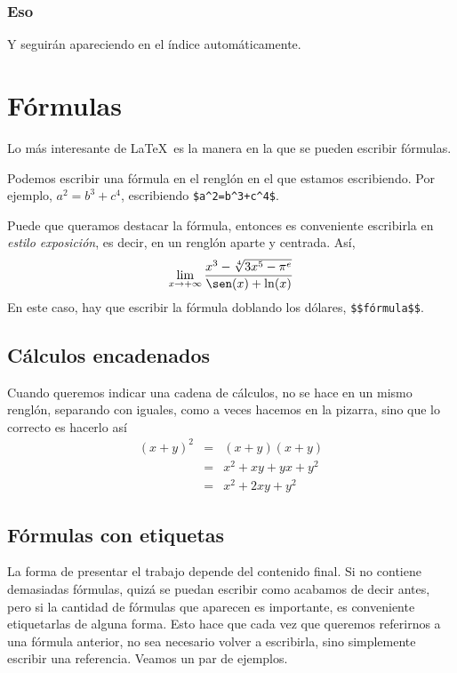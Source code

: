 \documentclass[a4paper,12pt]{article}
\begin{document}
{\subsubsection{Eso}

Y seguirán apareciendo en el índice automáticamente.


\section{Fórmulas}

Lo más interesante de \LaTeX \ es la manera en la que se pueden escribir fórmulas.


Podemos escribir una fórmula en el renglón en el que estamos escribiendo. Por ejemplo, $a^2=b^3+c^4$, escribiendo \verb|$a^2=b^3+c^4$|.

Puede que queramos destacar la fórmula, entonces es conveniente escribirla en \textsl{estilo exposición}, es decir, en un renglón aparte y centrada. Así,
$$\lim_{x\to +\infty}\dfrac{x^3-\sqrt[4]{3x^5-\pi^e}}{\sen(x)+\ln(x)}$$
En este caso, hay que escribir la fórmula doblando los dólares, \verb|$$fórmula$$|.


\subsection{Cálculos encadenados}

Cuando queremos indicar una cadena de cálculos, no se hace en un mismo renglón, separando con iguales, como a veces hacemos en la pizarra, sino que lo correcto es hacerlo así
$$\begin{array}{lll}
(x+y)^2&=&(x+y)(x+y)\\
&=&x^2+xy+yx+y^2\\
&=&x^2+2xy+y^2
\end{array}
$$

\subsection{Fórmulas con etiquetas}
La forma de presentar el trabajo depende del contenido final. Si no contiene demasiadas fórmulas, quizá se puedan escribir como acabamos de decir antes, pero si la cantidad de fórmulas que aparecen es importante, es conveniente etiquetarlas de alguna forma. Esto hace que cada vez que queremos referirnos a una fórmula anterior, no sea necesario volver a escribirla, sino simplemente escribir una referencia. Veamos un par de ejemplos.



}
\end{document}
